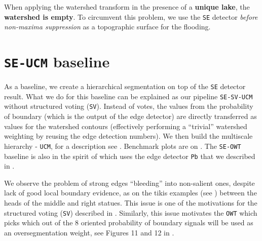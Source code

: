 When applying the watershed transform in the presence of a {\bf unique lake}, the {\bf watershed is empty}. To circumvent this problem, we use the {\tt SE} detector {\it before non-maxima suppression} as a topographic surface for the flooding.

\section{{\tt SE-UCM} baseline}
\label{sec:ch5-SE-UCM-baseline}
As a baseline, we create a hierarchical segmentation %
on top of the {\tt SE} detector result. What we do for this baseline can %
be explained %
as our pipeline {\tt SE-SV-UCM} without structured voting ({\tt SV}). Instead of votes, the values from the probability of boundary (which is the output of the edge detector) are directly transferred as values for the watershed contours (effectively performing a ``trivial'' watershed weighting by reusing the edge detection numbers). %
We then build the multiscale hierarchy - {\tt UCM}, for a description see . Benchmark plots are on . The {\tt SE-OWT} baseline is also in the spirit of \cite{Arbelaez2006boundary} which uses %
the edge detector {\tt Pb} that we described in . 

We observe the problem of strong edges ``bleeding'' into non-salient ones, despite lack of good local boundary evidence, as on the tikis examples (see ) between the heads of the middle and right statues. This issue is one of the motivations for the structured voting ({\tt SV}) described in . Similarly, this issue motivates the {\tt OWT} which picks which out of the 8 oriented probability of boundary signals will be used as an oversegmentation weight, see Figures 11 and 12 in \cite{Arbelaez11}.

